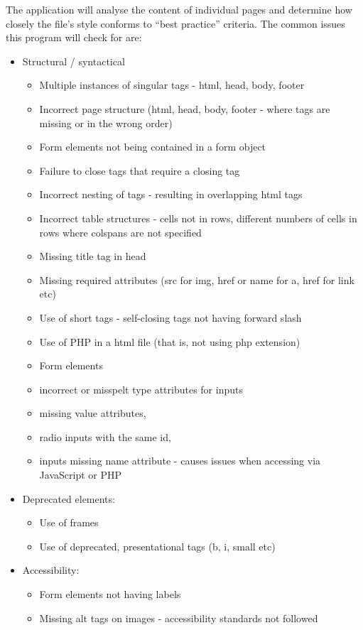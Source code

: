 \documentclass[12pt]{article}
\begin{document}
The application will analyse the content of individual pages and determine how closely the file's style conforms to ``best practice'' criteria. The common issues this program will check for are:
\begin{itemize}
\item Structural / syntactical
\begin{itemize}
\item Multiple instances of singular tags - html, head, body, footer
\item Incorrect page structure (html, head, body, footer - where tags are missing or in the wrong order)
\item Form elements not being contained in a form object
\item Failure to close tags that require a closing tag
\item Incorrect nesting of tags - resulting in overlapping html tags
\item Incorrect table structures - cells not in rows, different numbers of cells in rows where colspans are not specified
\item Missing title tag in head
\item Missing required attributes (src for img, href or name for a, href for link etc)
\item Use of short tags - self-closing tags not having forward slash
\item Use of PHP in a html file (that is, not using php extension)
\item Form elements
\item incorrect or misspelt type attributes for inputs
\item missing value attributes,
\item radio inputs with the same id,
\item inputs missing name attribute - causes issues when accessing via \\ JavaScript or PHP
\end{itemize}
\item Deprecated elements:
\begin{itemize}
\item Use of frames
\item Use of deprecated, presentational tags (b, i, small etc)
\end{itemize}
\item Accessibility:
\begin{itemize}
\item Form elements not having labels
\item Missing alt tags on images - accessibility standards not followed

\end{itemize}
\end{itemize}
\end{document}
